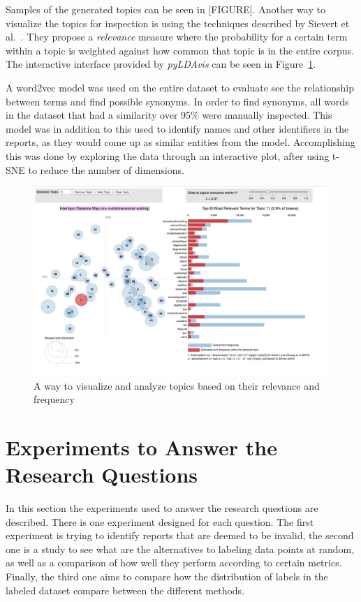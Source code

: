 Samples of the generated topics can be seen in [FIGURE].
Another way to visualize the topics for inspection is using the techniques described by Sievert et al\@.~\cite{sievert2014ldavis}.
They propose a \textit{relevance} measure where the probability for a certain term within a topic is weighted against how common that topic is in the entire corpus.
The interactive interface provided by \textit{pyLDAvis} can be seen in Figure~\ref{fig:ldavis-sample}.

A word2vec model was used on the entire dataset to evaluate see the relationship between terms and find possible synonyms.
In order to find synonyms, all words in the dataset that had a similarity over 95\% were manually inspected.
This model was in addition to this used to identify names and other identifiers in the reports, as they would come up as similar entities from the model.
Accomplishing this was done by exploring the data through an interactive plot, after using t-SNE to reduce the number of dimensions.

\begin{figure}
    \centering
    \includegraphics[scale=0.3]{figures/ldavis-sample.png}
    \caption{A way to visualize and analyze topics based on their relevance and frequency}
    \label{fig:ldavis-sample}
\end{figure}

\section{Experiments to Answer the Research Questions}\label{sec:exp1-method}
In this section the experiments used to answer the research questions are described.
There is one experiment designed for each question.
The first experiment is trying to identify reports that are deemed to be invalid, the second one is a study to see what are the alternatives to labeling data points at random, as well as a comparison of how well they perform according to certain metrics.
Finally, the third one aims to compare how the distribution of labels in the labeled dataset compare between the different methods.

